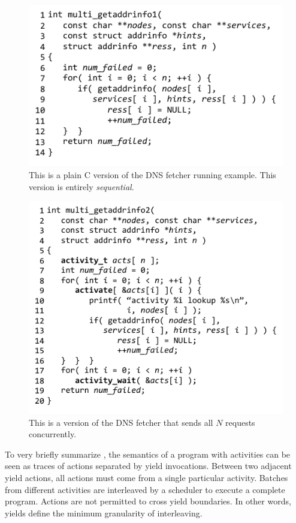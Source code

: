 \documentclass[9pt,preprint]{sigplanconf}
\begin{document}
\begin{figure}
\includegraphics{multi_getaddrinfo_seq}
\caption{This is a plain C version of the DNS fetcher running example.
  This version is entirely \emph{sequential}.}
\label{fig:charcoal_multidns_seq}
\end{figure}

\begin{figure}
\includegraphics{multi_getaddrinfo_conc}
\caption{This is a \charcoal{} version of the DNS fetcher that sends all $N$ requests concurrently.}
\label{fig:charcoal_multidns_conc}
\end{figure}

To very briefly summarize \cite{Abadi2009}, the semantics of a program with activities can be seen as traces of actions separated by yield invocations.
Between two adjacent yield actions, all actions must come from a single particular activity.
Batches from different activities are interleaved by a scheduler to execute a complete program.
Actions are not permitted to cross yield boundaries.
In other words, yields define the minimum granularity of interleaving.
\end{document}
